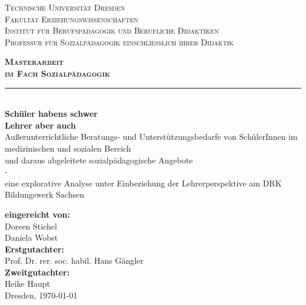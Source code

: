\begin{titlepage}
\begin{center}
\normalsize
\scshape
Technische Universität Dresden\\
\normalsize
\upshape
Fakultät Erziehungswissenschaften\\
Institut für Berufspädagogik und Berufliche Didaktiken\\
Professur für Sozialpädagogik einschließlich ihrer Didaktik\\[2,0cm]
\end{center}

\begin{center}
\Huge
\scshape
\bfseries
Masterarbeit\\[0,5cm]
\normalsize
\mdseries
im Fach Sozialpädagogik\\
\noindent\rule{\textwidth}{1pt}\\[1cm]
\normalsize
\mdseries
\textbf{Schüler haben\grq s schwer}\\
\textbf{Lehrer aber auch}\\[0,5cm]
\normalsize
\mdseries
Außerunterrichtliche Beratungs- und Unterstützungsbedarfe von SchülerInnen im medizinischen und sozialen Bereich\\ und daraus abgeleitete sozialpädagogische Angebote\\
-\\
eine explorative Analyse unter Einbeziehung der Lehrerperspektive am DRK Bildungswerk Sachsen\\[2,0cm]
\end{center}

\begin{center}
\textbf{eingereicht von:}\\
Doreen Stichel\\
Daniela Wobst\\[1,0cm]

\textbf{Erstgutachter:}\\
Prof. Dr. rer. soc. habil. Hans Gängler\\[1,0cm]
\textbf{Zweitgutachter:} \\
Heike Haupt\\[1,0cm]

Dresden, \today
\end{center}

\end{titlepage}